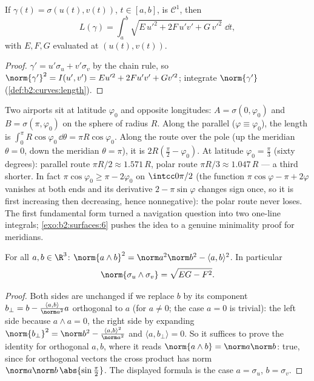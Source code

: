 \begin{proposition}\label{prop:b2:surfaces:curvelength}
If $\gamma(t) = \sigma(u(t), v(t))$, $t \in [a, b]$, is
$\mathcal{C}^1$, then
\[
L(\gamma) = \int_a^b
\sqrt{E\,u'^2 + 2F\,u'v' + G\,v'^2}\;\dd t ,
\]
with $E, F, G$ evaluated at $(u(t), v(t))$.
\end{proposition}

\begin{proof}
$\gamma' = u'\sigma_u + v'\sigma_v$ by the chain rule, so
$\norm{\gamma'}^2 = I(u', v') = Eu'^2 + 2Fu'v' + Gv'^2$; integrate
$\norm{\gamma'}$ (\cref{def:b2:curves:length}).
\end{proof}

\begin{example}\label{ex:b2:surfaces:polarroute}
Two airports sit at latitude $\varphi_0$ and opposite
longitudes: $A = \sigma(0, \varphi_0)$ and $B = \sigma(\pi,
\varphi_0)$ on the sphere of radius $R$. Along the parallel
($\varphi \equiv \varphi_0$), the length is
$\int_0^\pi R\cos\varphi_0\,\dd\theta = \pi R\cos\varphi_0$.
Along the route over the pole (up the meridian $\theta = 0$,
down the meridian $\theta = \pi$), it is $2R(\frac\pi2 -
\varphi_0)$. At latitude $\varphi_0 = \frac\pi3$ (sixty
degrees): parallel route $\pi R/2 \approx 1.571\,R$, polar
route $\pi R/3 \approx 1.047\,R$ --- a third shorter. In fact
$\pi\cos\varphi_0 \geq \pi - 2\varphi_0$ on
$\intcc0{\pi/2}$ (the function $\pi\cos\varphi - \pi +
2\varphi$ vanishes at both ends and its derivative $2 -
\pi\sin\varphi$ changes sign once, so it is first increasing
then decreasing, hence nonnegative): the polar route never
loses. The first fundamental form turned a navigation question
into two one-line integrals; \cref{exo:b2:surfaces:6} pushes
the idea to a genuine minimality proof for meridians.
\end{example}

\begin{lemma}\label{lem:b2:surfaces:lagrange}
For all $a, b \in \R^3$:
$\norm{a \wedge b}^2 = \norm a^2 \norm b^2 - \langle a, b\rangle^2$.
In particular
\[
\norm{\sigma_u \wedge \sigma_v} = \sqrt{EG - F^2}.
\]
\end{lemma}

\begin{proof}
Both sides are unchanged if we replace $b$ by its component $b_\perp
= b - \frac{\langle a, b\rangle}{\norm a^2}a$ orthogonal to $a$
(for $a \neq 0$; the case $a = 0$ is trivial): the left side
because $a \wedge a = 0$, the right side by expanding $\norm
{b_\perp}^2 = \norm b^2 - \frac{\langle a,b\rangle^2}{\norm a^2}$
and $\langle a, b_\perp\rangle = 0$. So it suffices to prove the
identity for orthogonal $a, b$, where it reads $\norm{a \wedge
b} = \norm a \norm b$: true, since for orthogonal vectors the
cross product has norm $\norm a\norm b\,\abs{\sin\frac\pi2}$. The
displayed formula is the case $a = \sigma_u$, $b = \sigma_v$.
\end{proof}

